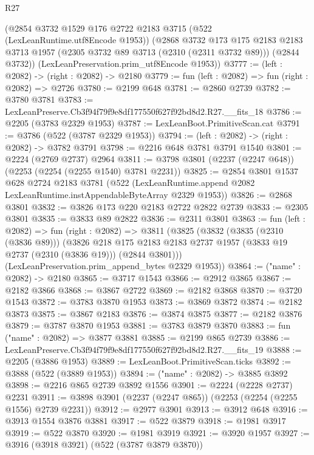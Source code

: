 \begin{lexlean}{R27}
\begin{coremodule}
    (@2854
      @3732
      @1529
      @176
      @2722
      @2183
      @3715
      (@522 (LexLeanRuntime.utf8Encode @1953))
      (@2868
        @3732
        @173
        @175
        @2183
        @2183
        @3713
        @1957
        (@2305 @3732 @89 @3713 (@2310 (@2311 @3732 @89)))
        (@2844 @3732))
      (LexLeanPreservation.prim_utf8Encode @1953))
@3777 := (left : @2082) -> (right : @2082) -> @2180
@3779 := fun (left : @2082) => fun (right : @2082) => @2726
@3780 := @2199 @648
@3781 := @2860 @2739
@3782 := @3780 @3781
@3783 := LexLeanPreserve.Cb3f94f79f9e8df177550f627f92bd8d2.R27.__fits_18
@3786 := @2205 (@3783 @2329 @1953)
@3787 := LexLeanBoot.PrimitiveScan.cat
@3791 := @3786 (@522 (@3787 @2329 @1953))
@3794 := (left : @2082) -> (right : @2082) -> @3782 @3791
@3798 := @2216 @648 @3781 @3791 @1540
@3801 := @2224 (@2769 @2737) @2964
@3811 := @3798 @3801 (@2237 (@2247 @648)) (@2253 (@2254 (@2255 @1540) @3781 @2231))
@3825 := @2854
    @3801
    @1537
    @628
    @2724
    @2183
    @3781
    (@522 (LexLeanRuntime.append @2082 LexLeanRuntime.instAppendableByteArray @2329 @1953))
@3826 := @2868 @3801
@3832 := @3826 @173 @220 @2183 @2722 @2822 @2739
@3833 := @2305 @3801
@3835 := @3833 @89 @2822
@3836 := @2311 @3801
@3863 := fun (left : @2082) =>
  fun (right : @2082) =>
  @3811
    (@3825
      (@3832
        (@3835 (@2310 (@3836 @89)))
        (@3826
          @218
          @175
          @2183
          @2183
          @2737
          @1957
          (@3833 @19 @2737 (@2310 (@3836 @19)))
          (@2844 @3801)))
      (LexLeanPreservation.prim_append_bytes @2329 @1953))
@3864 := ("name" : @2082) -> @2180
@3865 := @3717 @1543
@3866 := @2912 @3865
@3867 := @2182 @3866
@3868 := @3867 @2722
@3869 := @2182 @3868
@3870 := @3720 @1543
@3872 := @3783 @3870 @1953
@3873 := @3869 @3872
@3874 := @2182 @3873
@3875 := @3867 @2183
@3876 := @3874 @3875
@3877 := @2182 @3876
@3879 := @3787 @3870 @1953
@3881 := @3783 @3879 @3870
@3883 := fun ("name" : @2082) => @3877 @3881
@3885 := @2199 @865 @2739
@3886 := LexLeanPreserve.Cb3f94f79f9e8df177550f627f92bd8d2.R27.__fits_19
@3888 := @2205 (@3886 @1953)
@3889 := LexLeanBoot.PrimitiveScan.ticks
@3892 := @3888 (@522 (@3889 @1953))
@3894 := ("name" : @2082) -> @3885 @3892
@3898 := @2216 @865 @2739 @3892 @1556
@3901 := @2224 (@2228 @2737) @2231
@3911 := @3898 @3901 (@2237 (@2247 @865)) (@2253 (@2254 (@2255 @1556) @2739 @2231))
@3912 := @2977 @3901
@3913 := @3912 @648
@3916 := @3913 @1554 @3876 @3881
@3917 := @522 @3879
@3918 := @1981 @3917
@3919 := @522 @3870
@3920 := @1981 @3919
@3921 := @3920 @1957
@3927 := @3916 (@3918 @3921) (@522 (@3787 @3879 @3870))

\end{coremodule}
\end{lexlean}
